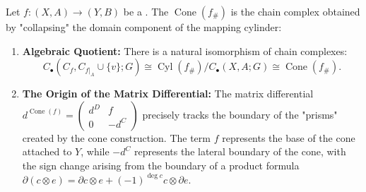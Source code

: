 \begin{theorem} \label{theorem:precise_correspondence_between_topological_cones_of_pairs_of_spaces_and_algebraic_cones_of_singular_chain_complexes}
Let $f: (X, A) \to (Y, B)$ be a . The  $\operatorname{Cone}(f_\#)$ is the chain complex obtained by "collapsing" the domain component of the mapping cylinder:

\begin{enumerate}
    \item \textbf{Algebraic Quotient:} There is a natural isomorphism of chain complexes:
    $$ C_\bullet(C_f, C_{f|_A} \cup \{v\}; G) \cong \operatorname{Cyl}(f_\#) / C_\bullet(X, A; G) \cong \operatorname{Cone}(f_\#). $$
    
    \item \textbf{The Origin of the Matrix Differential:} The matrix differential 
    $d^{\operatorname{Cone}(f)} = \begin{pmatrix} d^D & f \\ 0 & -d^C \end{pmatrix}$
    precisely tracks the boundary of the "prisms" created by the cone construction. The term $f$ represents the base of the cone attached to $Y$, while $-d^C$ represents the lateral boundary of the cone, with the sign change arising from the boundary of a product formula $\partial(c \otimes e) = \partial c \otimes e + (-1)^{\deg c} c \otimes \partial e$.
\end{enumerate}
\end{theorem}